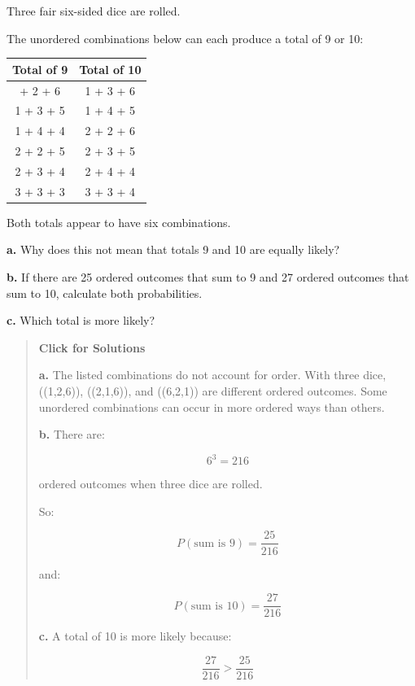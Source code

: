 \documentclass[
  letterpaper,
  DIV=11,
  numbers=noendperiod]{scrreprt}
\begin{document}
\begin{tcolorbox}[enhanced jigsaw, arc=.35mm, bottomrule=.15mm, bottomtitle=1mm, breakable, colback=white, colbacktitle=quarto-callout-note-color!10!white, colframe=quarto-callout-note-color-frame, coltitle=black, left=2mm, leftrule=.75mm, opacityback=0, opacitybacktitle=0.6, rightrule=.15mm, title=\textcolor{quarto-callout-note-color}{\faInfo}\hspace{0.5em}{Question 5}, titlerule=0mm, toprule=.15mm, toptitle=1mm]

Three fair six-sided dice are rolled.

The unordered combinations below can each produce a total of 9 or 10:

\begin{table}
\fontsize{12.0pt}{14.0pt}\selectfont
\begin{tabular*}{\linewidth}{@{\extracolsep{\fill}}cc}
\toprule
Total of 9 & Total of 10 \\ 
\midrule\addlinespace[2.5pt]
1 + 2 + 6 & 1 + 3 + 6 \\ 
1 + 3 + 5 & 1 + 4 + 5 \\ 
1 + 4 + 4 & 2 + 2 + 6 \\ 
2 + 2 + 5 & 2 + 3 + 5 \\ 
2 + 3 + 4 & 2 + 4 + 4 \\ 
3 + 3 + 3 & 3 + 3 + 4 \\ 
\bottomrule
\end{tabular*}
\end{table}

Both totals appear to have six combinations.

\textbf{a.} Why does this not mean that totals 9 and 10 are equally
likely?

\textbf{b.} If there are 25 ordered outcomes that sum to 9 and 27
ordered outcomes that sum to 10, calculate both probabilities.

\textbf{c.} Which total is more likely?

\begin{quote}
\textbf{Click for Solutions}

\textbf{a.} The listed combinations do not account for order. With three
dice, ((1,2,6)), ((2,1,6)), and ((6,2,1)) are different ordered
outcomes. Some unordered combinations can occur in more ordered ways
than others.

\textbf{b.} There are:

\[
6^3 = 216
\]

ordered outcomes when three dice are rolled.

So:

\[
P(\text{sum is 9}) = \frac{25}{216}
\]

and:

\[
P(\text{sum is 10}) = \frac{27}{216}
\]

\textbf{c.} A total of 10 is more likely because:

\[
\frac{27}{216} > \frac{25}{216}
\]
\end{quote}

\end{tcolorbox}
\end{document}
